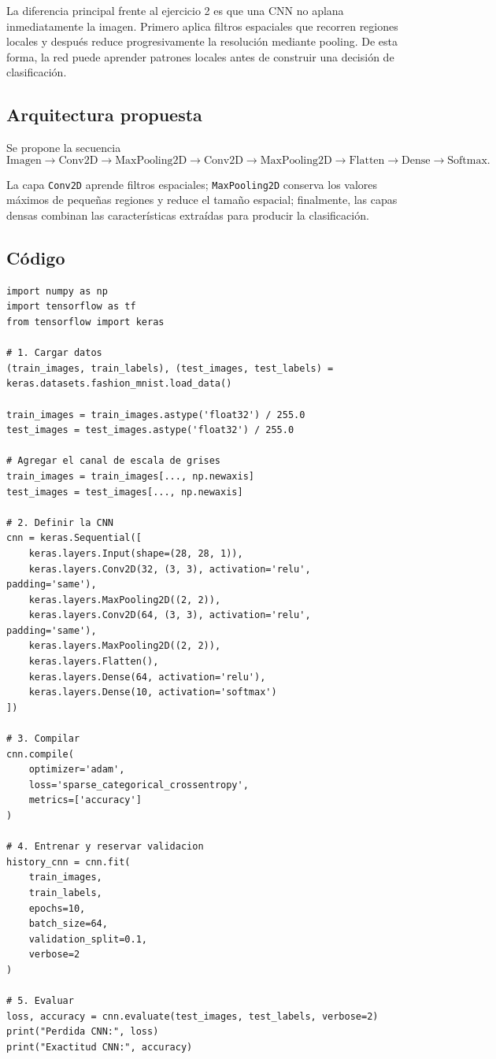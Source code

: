 \documentclass[14pt,twoside]{article}
\begin{document}
La diferencia principal frente al ejercicio 2 es que una CNN no aplana inmediatamente la imagen. Primero aplica filtros espaciales que recorren regiones locales y después reduce progresivamente la resolución mediante pooling. De esta forma, la red puede aprender patrones locales antes de construir una decisión de clasificación.

\subsection{Arquitectura propuesta}

Se propone la secuencia
\[
\text{Imagen}
\rightarrow \text{Conv2D}
\rightarrow \text{MaxPooling2D}
\rightarrow \text{Conv2D}
\rightarrow \text{MaxPooling2D}
\rightarrow \text{Flatten}
\rightarrow \text{Dense}
\rightarrow \text{Softmax}.
\]

La capa \texttt{Conv2D} aprende filtros espaciales; \texttt{MaxPooling2D} conserva los valores máximos de pequeñas regiones y reduce el tamaño espacial; finalmente, las capas densas combinan las características extraídas para producir la clasificación.

\subsection{Código}

\begin{lstlisting}[style=pgpython,caption={Punto libre: CNN sencilla para Fashion-MNIST.}]
import numpy as np
import tensorflow as tf
from tensorflow import keras

# 1. Cargar datos
(train_images, train_labels), (test_images, test_labels) = keras.datasets.fashion_mnist.load_data()

train_images = train_images.astype('float32') / 255.0
test_images = test_images.astype('float32') / 255.0

# Agregar el canal de escala de grises
train_images = train_images[..., np.newaxis]
test_images = test_images[..., np.newaxis]

# 2. Definir la CNN
cnn = keras.Sequential([
    keras.layers.Input(shape=(28, 28, 1)),
    keras.layers.Conv2D(32, (3, 3), activation='relu', padding='same'),
    keras.layers.MaxPooling2D((2, 2)),
    keras.layers.Conv2D(64, (3, 3), activation='relu', padding='same'),
    keras.layers.MaxPooling2D((2, 2)),
    keras.layers.Flatten(),
    keras.layers.Dense(64, activation='relu'),
    keras.layers.Dense(10, activation='softmax')
])

# 3. Compilar
cnn.compile(
    optimizer='adam',
    loss='sparse_categorical_crossentropy',
    metrics=['accuracy']
)

# 4. Entrenar y reservar validacion
history_cnn = cnn.fit(
    train_images,
    train_labels,
    epochs=10,
    batch_size=64,
    validation_split=0.1,
    verbose=2
)

# 5. Evaluar
loss, accuracy = cnn.evaluate(test_images, test_labels, verbose=2)
print("Perdida CNN:", loss)
print("Exactitud CNN:", accuracy)
\end{lstlisting}
\end{document}
